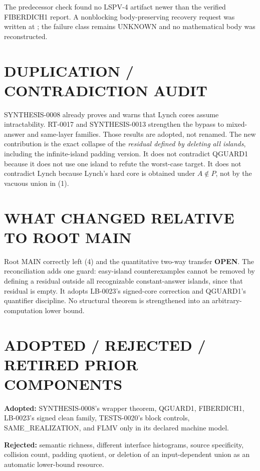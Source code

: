 \documentclass[11pt]{article}
\newcommand{\OPEN}{\textbf{OPEN}}
\newcommand{\claim}[1]{\texttt{\detokenize{#1}}}
\begin{document}
The predecessor check found no LSPV-4 artifact newer than the verified
FIBERDICH1 report.  A nonblocking body-preserving recovery request was written
at ;
the failure class remains UNKNOWN and no mathematical body was reconstructed.

\section{DUPLICATION / CONTRADICTION AUDIT}

SYNTHESIS-0008 already proves \claim{RECOGNIZABLE-ISLAND-BARRIER1} and warns
that Lynch cores assume intractability.  RT-0017 and SYNTHESIS-0013 strengthen
the bypass to mixed-answer and same-layer families.  Those results are
adopted, not renamed.  The new contribution is the exact collapse of the
\emph{residual defined by deleting all islands}, including the infinite-island
padding version.  It does not contradict QGUARD1 because it does not use one
island to refute the worst-case target.  It does not contradict Lynch because
Lynch's hard core is obtained under $A\notin P$, not by the vacuous union in
(1).

\section{WHAT CHANGED RELATIVE TO ROOT MAIN}

Root MAIN correctly left (4) and the quantitative two-way transfer \OPEN.
The reconciliation adds one guard: easy-island counterexamples cannot be
removed by defining a residual outside all recognizable constant-answer
islands, since that residual is empty.  It adopts LB-0023's signed-core
correction and QGUARD1's quantifier discipline.  No structural theorem is
strengthened into an arbitrary-computation lower bound.

\section{ADOPTED / REJECTED / RETIRED PRIOR COMPONENTS}

\textbf{Adopted:} SYNTHESIS-0008's wrapper theorem, QGUARD1, FIBERDICH1,
LB-0023's signed clean family, TESTS-0020's block controls, SAME\_REALIZATION,
and FLMV only in its declared machine model.

\textbf{Rejected:} semantic richness, different interface histograms,
source specificity, collision count, padding quotient, or deletion of an
input-dependent union as an automatic lower-bound resource.
\end{document}
